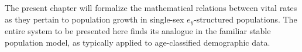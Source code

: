  \FloatBarrier
The present chapter will formalize the mathematical relations between vital
rates as they pertain to population growth in single-sex $e_y$-structured
populations. The entire system to be presented here finds its analogue in the
familiar stable population model, as typically applied to age-classified
demographic data.
